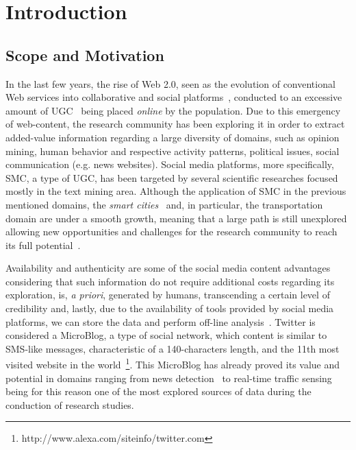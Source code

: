 \chapter{Introduction} \label{chap:intro}

\minitoc \mtcskip \noindent

\section{Scope and Motivation}\label{sec:scope_motivation}

In the last few years, the rise of Web 2.0, seen as the evolution of conventional Web services into collaborative and social platforms~\cite{chi2008social}, conducted to an excessive amount of \gls{UGC}~\cite{kaplan2010users} being placed \textit{online} by the population. Due to this emergency of web-content, the research community has been exploring it in order to extract added-value information regarding a large diversity of domains, such as opinion mining, human behavior and respective activity patterns, political issues, social communication (e.g. news websites). Social media platforms, more specifically, \gls{SMC}, a type of \gls{UGC}, has been targeted by several scientific researches focused mostly in the text mining area. Although the application of SMC in the previous mentioned domains, the \textit{smart cities}~\cite{batty2012smart} and, in particular, the transportation~\cite{gal2014potential} domain are under a smooth growth, meaning that a large path is still unexplored allowing new opportunities and challenges for the research community to reach its full potential~\cite{musto2015crowdpulse}.

Availability and authenticity are some of the social media content advantages considering that such information do not require additional costs regarding its exploration, is, \textit{a priori}, generated by humans, transcending a certain level of credibility and, lastly, due to the availability of tools provided by social media platforms, we can store the data and perform off-line analysis~\cite{kuflik2017automating}. Twitter is considered a \gls{MicroBlog}, a type of social network, which content is similar to SMS-like messages, characteristic of a 140-characters length, and the 11th most visited website in the world~\footnote{http://www.alexa.com/siteinfo/twitter.com}. This \gls{MicroBlog} has already proved its value and potential in domains ranging from news detection~\cite{kn:Sankaranarayanan2009} to real-time traffic sensing~\cite{carvalho2010real} being for this reason one of the most explored sources of data during the conduction of research studies.

